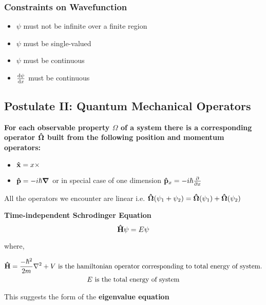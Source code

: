 \documentclass[11pt]{article}
\theoremstyle{definition}
\begin{document}
\subsubsection{Constraints on Wavefunction}

\begin{itemize}
    \item $\psi$ must not be infinite over a finite region
    \item $\psi$ must be single-valued
    \item $\psi$ must be continuous
    \item $\dv{\psi}{x}$ must be continuous
\end{itemize}


\subsection{Postulate II: Quantum Mechanical Operators}

\textbf{For each observable property $\Omega$ of a system there is a corresponding operator $\vectorunit{\Omega}$ built from the following position and momentum operators:}

\begin{itemize}
    \item $\vectorunit{x} = x \times$
    \item $\vectorunit{p} = -i \hbar \grad$ or in special case of one dimension $\vectorunit{p}_x = -i\hbar \pdv{x}$
\end{itemize}

All the operators we encounter are linear i.e. $\vectorunit{\Omega}(\psi_1 + \psi_2) =  \vectorunit{\Omega}(\psi_1) + \vectorunit{\Omega}(\psi_2)$

\begin{shaded}
\textbf{Time-independent Schrodinger Equation}
\begin{equation*}
\vectorunit{H}\psi = E\psi
\end{equation*}

where,

\begin{gather*}
\vectorunit{H} = \frac{-\hbar^2}{2m} \laplacian + V \text{ is the hamiltonian operator corresponding to total energy of system.} \\
E \text{ is the total energy of system}
\end{gather*}
\end{shaded}



This suggests the form of the \textbf{eigenvalue equation} 
\end{document}
